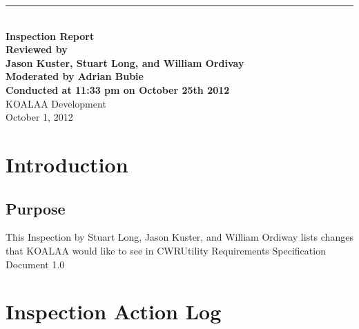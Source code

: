\documentclass[pdftex,12pt,letter]{article}
\newcommand{\HRule}{\rule{\linewidth}{0.5mm}}
\begin{document}
\begin{titlepage}
\begin{flushright}
\HRule \\[0.4cm]
{ \bfseries
{\huge Inspection Report\\[1cm]}
{\large Reviewed by\\Jason Kuster, Stuart Long, and William Ordivay\\
\normalsize Moderated by Adrian Bubie}\\[1cm]
\normalsize Conducted at 11:33 pm on October 25th 2012}\\[1cm]
KOALAA Development\\[1cm]
October 1, 2012
\end{flushright}
\end{titlepage}
\begin{flushleft}
\section{Introduction}
\subsection{Purpose}
This Inspection by Stuart Long, Jason Kuster, and William Ordiway lists changes that KOALAA would like to see in CWRUtility Requirements Specification Document 1.0
\section{Inspection Action Log}


\end{flushleft}
\end{document}
